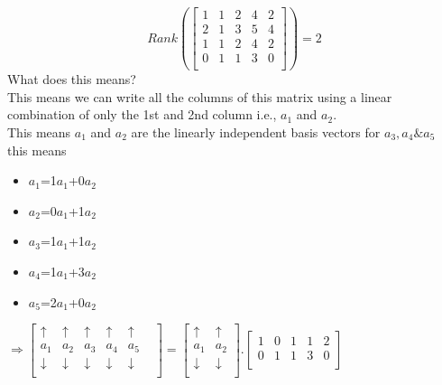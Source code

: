\documentclass{article}
\begin{document}
$$
  Rank\left(
  \begin{bmatrix}
      1 & 1 & 2 & 4 & 2 \\
      2 & 1 & 3 & 5 & 4 \\
      1 & 1 & 2 & 4 & 2 \\
      0 & 1 & 1 & 3 & 0 \\
    \end{bmatrix}
  \right)=2
$$
What does this means?\\
This means we can write all the columns of this matrix using a linear combination of only the 1st and 2nd column i.e., $a_1$ and $a_2$.\\
This means $a_1$ and $a_2$ are the linearly independent basis vectors for $a_3,a_4 \& a_5$\\
this means \\
\begin{itemize}
  \item $a_1$=1$a_1$+0$a_2$
  \item $a_2$=0$a_1$+1$a_2$
  \item $a_3$=1$a_1$+1$a_2$
  \item $a_4$=1$a_1$+3$a_2$
  \item $a_5$=2$a_1$+0$a_2$
\end{itemize}$\Longrightarrow \begin{bmatrix}
    \uparrow &\uparrow &\uparrow &\uparrow &\uparrow \\
    a_1&a_2&a_3&a_4&a_5\\
    \downarrow & \downarrow & \downarrow & \downarrow & \downarrow &   \\
  \end{bmatrix}=\begin{bmatrix}
    \uparrow   & \uparrow   \\
    a_1        & a_2        \\
    \downarrow & \downarrow \\
  \end{bmatrix}.\begin{bmatrix}
    1 & 0 & 1 & 1 & 2 \\
    0 & 1 & 1 & 3 & 0 \\
  \end{bmatrix}$
\pagebreak
\end{document}
